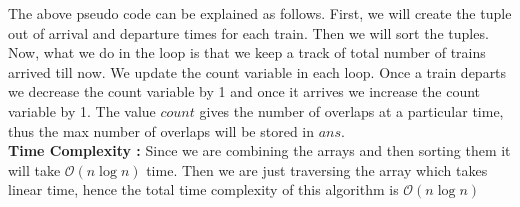 \documentclass[14pt]{article}
\begin{document}
		The above pseudo code can be explained as follows. First, we will create the tuple out of arrival and departure times for each train. Then we will sort the tuples. Now, what we do in the loop is that we keep a track of total number of trains arrived till now. We update the count variable in each loop. Once a train departs we decrease the count variable by 1 and once it arrives we increase the count variable by 1. The value $ count $ gives the number of overlaps at a particular time, thus the max number of overlaps will be stored in $ans$.\\
		\newline
		\textbf{Time Complexity : }Since we are combining the arrays and then sorting them it will take $\mathcal{O}(n\log n) $ time. Then we are just traversing the array which takes linear time, hence the total time complexity of this algorithm is $\mathcal{O}(n\log n)$
	
	\newpage
	
\end{document}
